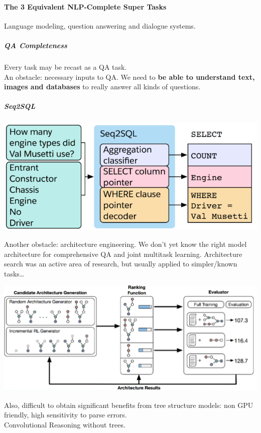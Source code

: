 \documentclass[10pt]{report}
\begin{document}
\paragraph{The 3 Equivalent NLP-Complete Super Tasks} Language modeling, question answering and dialogue systems.
\subparagraph{QA Completeness} Every task may be recast as a QA task.\\
An obstacle: necessary inputs to QA. We need to \textbf{be able to understand text, images and databases} to really answer all kinds of questions.
\subparagraph{Seq2SQL}
\begin{center}
	\includegraphics[scale=0.5]{142.png}
\end{center}
Another obstacle: architecture engineering. We don't yet know the right model architecture for comprehensive QA and joint multitask learning. Architecture search was an active area of research, but usually applied to simpler/known tasks\ldots
\begin{center}
	\includegraphics[scale=0.5]{143.png}
\end{center}
Also, difficult to obtain significant benefits from tree structure models: non GPU friendly, high sensitivity to parse errors.\\
Convolutional Reasoning without trees.
\end{document}
